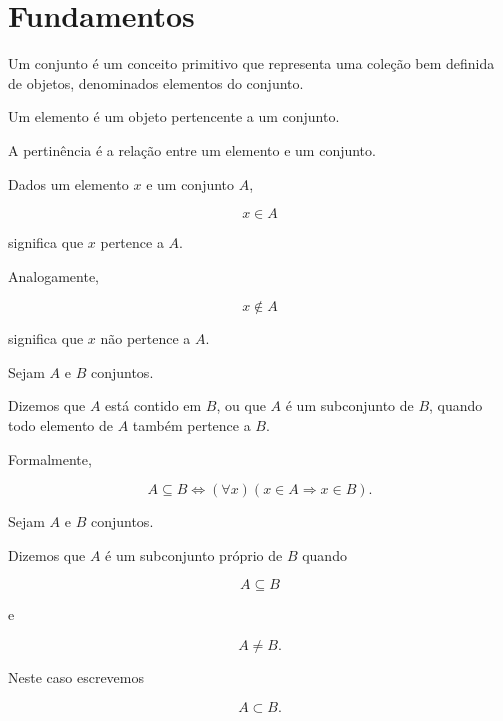 \documentclass[../../main]{subfiles}
\begin{document}
\section{Fundamentos}
\label{sec:matematica:teoria-conjuntos:fundamentos}

\begin{defn}[Conjunto]
	\label{def:matematica:teoria-conjuntos:fundamentos:conjunto}

	Um conjunto é um conceito primitivo que representa uma coleção bem
	definida de objetos, denominados elementos do conjunto.
\end{defn}

\begin{defn}[Elemento]
	\label{def:matematica:teoria-conjuntos:fundamentos:elemento}

	Um elemento é um objeto pertencente a um conjunto.
\end{defn}

\begin{defn}[Pertinência]
	\label{def:matematica:teoria-conjuntos:fundamentos:pertinencia}

	A pertinência é a relação entre um elemento e um conjunto.

	Dados um elemento \(x\) e um conjunto \(A\),

	\[
		x \in A
	\]

	significa que \(x\) pertence a \(A\).

	Analogamente,

	\[
		x \notin A
	\]

	significa que \(x\) não pertence a \(A\).
\end{defn}

\begin{defn}[Inclusão]
	\label{def:matematica:teoria-conjuntos:fundamentos:inclusao}

	Sejam \(A\) e \(B\) conjuntos.

	Dizemos que \(A\) está contido em \(B\), ou que \(A\) é um subconjunto
	de \(B\), quando todo elemento de \(A\) também pertence a \(B\).

	Formalmente,

	\[
		A \subseteq B
		\iff
		(\forall x)
		(x \in A \Rightarrow x \in B).
	\]
\end{defn}

\begin{defn}
	\label{def:matematica:teoria-conjuntos:fundamentos:subconjunto-proprio}

	Sejam \(A\) e \(B\) conjuntos.

	Dizemos que \(A\) é um subconjunto próprio de \(B\) quando

	\[
		A \subseteq B
	\]

	e

	\[
		A \neq B.
	\]

	Neste caso escrevemos

	\[
		A \subset B.
	\]
\end{defn}
\end{document}
